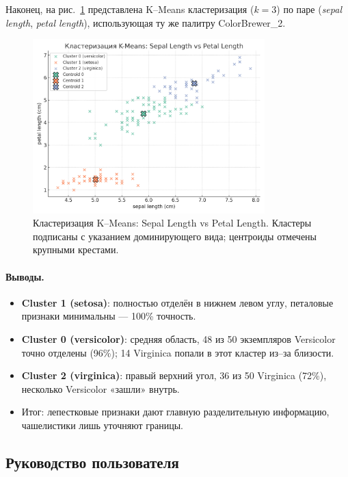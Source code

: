 Наконец, на рис.~\ref{fig:kmeans_cb2} представлена K–Means кластеризация ($k=3$) по паре (\emph{sepal length}, \emph{petal length}), использующая ту же палитру ColorBrewer\_2.

\begin{figure}[ht]
  \centering
  \includegraphics[width=0.8\textwidth]{images/cluster_plot_cb2.png}
  \caption{Кластеризация K–Means: Sepal Length vs Petal Length. Кластеры подписаны с указанием доминирующего вида; центроиды отмечены крупными крестами.}
  \label{fig:kmeans_cb2}
\end{figure}

\paragraph{Выводы.}
\begin{itemize}
  \item \textbf{Cluster 1 (setosa)}: полностью отделён в нижнем левом углу, петаловые признаки минимальны — 100\% точность.
  \item \textbf{Cluster 0 (versicolor)}: средняя область, 48 из 50 экземпляров Versicolor точно отделены (96\%); 14 Virginica попали в этот кластер из–за близости.
  \item \textbf{Cluster 2 (virginica)}: правый верхний угол, 36 из 50 Virginica (72\%), несколько Versicolor «зашли» внутрь.
  \item Итог: лепестковые признаки дают главную разделительную информацию, чашелистики лишь уточняют границы.
\end{itemize}

\subsection{Руководство пользователя}\label{sec:user-guide}

